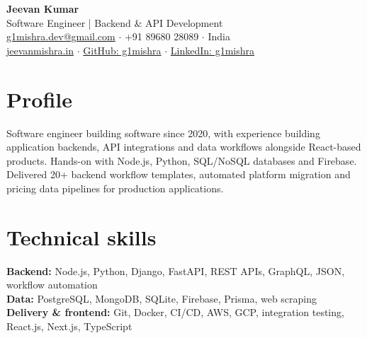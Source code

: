 \documentclass[a4paper,10pt]{article}
\begin{document}
\begin{center}
{\LARGE\textbf{Jeevan Kumar}}\\[3pt]
Software Engineer | Backend \& API Development\\[3pt]
\href{mailto:g1mishra.dev@gmail.com}{g1mishra.dev@gmail.com} $\cdot$ +91 89680 28089 $\cdot$ India\\[2pt]
\href{https://jeevanmishra.in}{jeevanmishra.in} $\cdot$ \href{https://github.com/g1mishra}{GitHub: g1mishra} $\cdot$ \href{https://linkedin.com/in/g1mishra}{LinkedIn: g1mishra}
\end{center}
\section{Profile}
Software engineer building software since 2020, with experience building application backends, API integrations and data workflows alongside React-based products. Hands-on with Node.js, Python, SQL/NoSQL databases and Firebase. Delivered 20+ backend workflow templates, automated platform migration and pricing data pipelines for production applications.
\section{Technical skills}
\textbf{Backend:} Node.js, Python, Django, FastAPI, REST APIs, GraphQL, JSON, workflow automation\\ \textbf{Data:} PostgreSQL, MongoDB, SQLite, Firebase, Prisma, web scraping\\ \textbf{Delivery \& frontend:} Git, Docker, CI/CD, AWS, GCP, integration testing, React.js, Next.js, TypeScript
\end{document}
